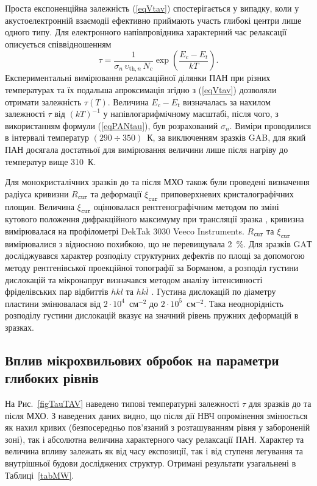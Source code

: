 \documentclass[a4paper,14pt,oneside,openany]{memoir}
\begin{document}
Проста експоненційна залежність (\ref{eqVtav}) спостерігається у випадку, коли у акустоелектронній взаємодії ефективно приймають участь глибокі центри лише одного типу.
Для електронного напівпровідника характерний час релаксації описується співвідношенням \cite{Saiko1993,Rzanov,OstrovPAN}
\begin{equation}\label{eqPANtau}
  \tau=\frac{1}{\sigma_n\,\upsilon_{\mathrm{th},n}\,N_c}\exp\left(\frac{E_c-E_t}{kT}\right).
\end{equation}
Експериментальні вимірювання релаксаційної ділянки ПАН при різних температурах та їх подальша апроксимація згідно з (\ref{eqVtav}) дозволяли отримати
залежність $\tau(T)$.
Величина $E_c-E_t$ визначалась за нахилом залежності $\tau$ від $(kT)^{-1}$ у напівлогарифмічному масштабі, після чого, з використанням формули (\ref{eqPANtau}),
був розрахований $\sigma_n$.
Виміри проводилися в інтервалі температур $(290\div350)$~К,
за виключенням зразків GAB, для який ПАН досягала достатньої для вимірювання величини лише після нагріву до температур вище 310~К.

Для монокристалічних зразків до та після МХО також були проведені визначення радіуса кривизни $R_\mathtt{cur}$ та
деформації $\xi_\mathtt{cur}$ приповерхневих кристалографічних площин.
Величина $\xi_\mathtt{cur}$ оцінювалася рентгенографічним методом по зміні кутового положення дифракційного максимуму при трансляції зразка \cite{Godwod},
кривизна вимірювалася на профілометрі DekTak 3030 Veeco Instruments.
$R_\mathtt{cur}$ та $\xi_\mathtt{cur}$ вимірювалися  з відносною похибкою, що не перевищувала 2~\%.
Для зразків GAТ досліджувався характер розподілу структурних дефектів по площі за допомогою методу
рентгенівської проекційної топографії за Борманом,
а розподіл густини дислокацій та мікронапруг визначався методом аналізу інтенсивності фріделівських пар відбиттів $hkl$ та $hk\overline{l}$ \cite{ThoricBook}.
Густина дислокацій по діаметру пластини змінювалася від $2\cdot10^{4}$~см$^{-2}$ до $2\cdot10^{5}$~см$^{-2}$.
Така неоднорідність розподілу густини дислокацій вказує на значний рівень пружних деформацій в зразках.

\subsection{Вплив мікрохвильових обробок на параметри глибоких рівнів}

На Рис.~\ref{figTauTAV} наведено типові температурні залежності $\tau$ для зразків до та після МХО.
З наведених даних видно, що після дії НВЧ опромінення змінюється як нахил кривих (безпосередньо пов'язаний
з розташуванням рівня у забороненій зоні), так і абсолютна величина характерного часу релаксації ПАН.
Характер та величина впливу залежать як від часу експозиції, так і від ступеня легування та внутрішньої будови
досліджених структур.
Отримані результати узагальнені в Таблиці~\ref{tabMW}.
\end{document}
